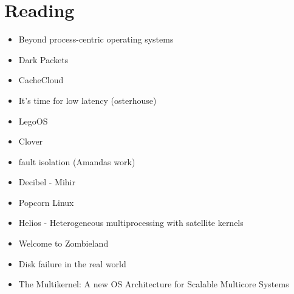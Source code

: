 \section{Reading}
\label{sec:reading}
\begin{itemize}
    \item{Beyond process-centric operating systems}~\cite{189914}\rpaper{}
    \item{Dark Packets}\rabstract{}
    \item{CacheCloud}~\cite{cachecloud}\rintro{+}
    \item{It's time for low latency (osterhouse)}
    \item{LegoOS}\cite{legoos}\rpaper{}
    \item {Clover}\cite{254441}\rpaper{}
    \item{fault isolation (Amandas work)}\rintro{}
    \item{Decibel - Mihir}\rabstract{}
    \item{Popcorn Linux}
    \item{Helios - Heterogeneous multiprocessing with satellite kernels}~\cite{helios}\rabstract{}
    \item{Welcome to Zombieland}~\cite{zombieland}\rintro{}
    \item{Disk failure in the real world}~\cite{Schroeder:2007:DFR:1267903.1267904}\rabstract{}
    \item{The Multikernel: A new OS Architecture for Scalable Multicore Systems}~\cite{the-multikernel}\rabstract{}

\end{itemize}
